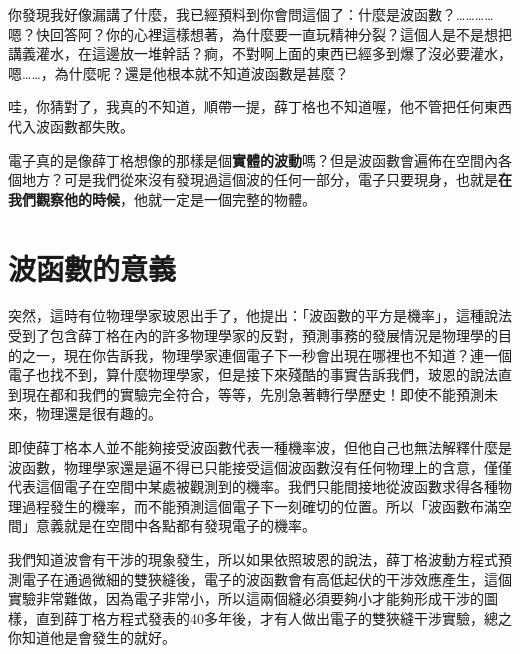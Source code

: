 你發現我好像漏講了什麼，我已經預料到你會問這個了：什麼是波函數？…………嗯？快回答阿？你的心裡這樣想著，為什麼要一直玩精神分裂？這個人是不是想把講義灌水，在這邊放一堆幹話？痾，不對啊上面的東西已經多到爆了沒必要灌水，嗯……，為什麼呢？還是他根本就不知道波函數是甚麼？

哇，你猜對了，我真的不知道，順帶一提，薛丁格也不知道喔，他不管把任何東西代入波函數都失敗。

電子真的是像薛丁格想像的那樣是個\textbf{實體的波動}嗎？但是波函數會遍佈在空間內各個地方？可是我們從來沒有發現過這個波的任何一部分，電子只要現身，也就是\textbf{在我們觀察他的時候}，他就一定是一個完整的物體。

\section{波函數的意義}
突然，這時有位物理學家玻恩出手了，他提出：「波函數的平方是機率」，這種說法受到了包含薛丁格在內的許多物理學家的反對，預測事務的發展情況是物理學的目的之一，現在你告訴我，物理學家連個電子下一秒會出現在哪裡也不知道？連一個電子也找不到，算什麼物理學家，但是接下來殘酷的事實告訴我們，玻恩的說法直到現在都和我們的實驗完全符合，等等，先別急著轉行學歷史！即使不能預測未來，物理還是很有趣的。

即使薛丁格本人並不能夠接受波函數代表一種機率波，但他自己也無法解釋什麼是波函數，物理學家還是逼不得已只能接受這個波函數沒有任何物理上的含意，僅僅代表這個電子在空間中某處被觀測到的機率。我們只能間接地從波函數求得各種物理過程發生的機率，而不能預測這個電子下一刻確切的位置。所以「波函數布滿空間」意義就是在空間中各點都有發現電子的機率。

我們知道波會有干涉的現象發生，所以如果依照玻恩的說法，薛丁格波動方程式預測電子在通過微細的雙狹縫後，電子的波函數會有高低起伏的干涉效應產生，這個實驗非常難做，因為電子非常小，所以這兩個縫必須要夠小才能夠形成干涉的圖樣，直到薛丁格方程式發表的40多年後，才有人做出電子的雙狹縫干涉實驗，總之你知道他是會發生的就好。

